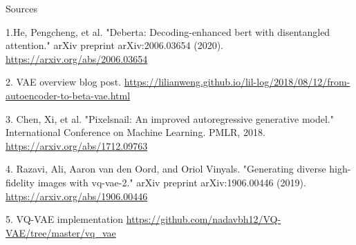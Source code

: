 \documentclass{beamer}
\begin{document}
\begin{frame}{Sources}
\begin{thebibliography}{0}

   1.He, Pengcheng, et al. "Deberta: Decoding-enhanced bert with disentangled attention." arXiv preprint arXiv:2006.03654 (2020). \url{https://arxiv.org/abs/2006.03654} 
  
   2. VAE overview blog post. \url{https://lilianweng.github.io/lil-log/2018/08/12/from-autoencoder-to-beta-vae.html}
  
   3. Chen, Xi, et al. "Pixelsnail: An improved autoregressive generative model." International Conference on Machine Learning. PMLR, 2018. \url{https://arxiv.org/abs/1712.09763}
  
   4. Razavi, Ali, Aaron van den Oord, and Oriol Vinyals. "Generating diverse high-fidelity images with vq-vae-2." arXiv preprint arXiv:1906.00446 (2019). \url{https://arxiv.org/abs/1906.00446}
  
   5. VQ-VAE implementation \url{https://github.com/nadavbh12/VQ-VAE/tree/master/vq_vae}
  
\end{thebibliography}

\end{frame}

 
\end{document}
